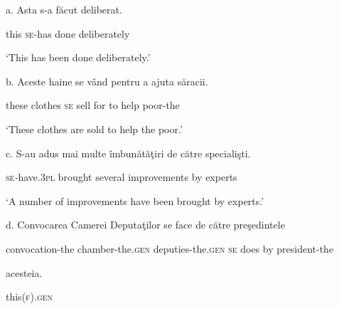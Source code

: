 \documentclass[output=paper]{langsci/langscibook}
\begin{document}
          a.   Asta s-a      făcut deliberat.

\begin{styleDSb}
      this  \textsc{se}{}-has done  deliberately
\end{styleDSb}

\begin{styleDSb}
     ‘This has been done deliberately.’
\end{styleDSb}

\begin{styleDSb}
b.   Aceste haine   se vând pentru a ajuta săracii.
\end{styleDSb}

\begin{styleDSb}
      these   clothes \textsc{se} sell   for      to help poor-the
\end{styleDSb}

\begin{styleDSb}
      ‘These clothes are sold to help the poor.’
\end{styleDSb}

\begin{styleDSb}
c.   S{}-au              adus     mai multe îmbunătăţiri    de către specialişti.
\end{styleDSb}

\begin{styleDSb}
    \textsc{se}\textit{{}-}have.\textsc{3pl} brought several      improvements by         experts
\end{styleDSb}

\begin{styleDSb}
     ‘A number of improvements have been brought by experts.’
\end{styleDSb}

\begin{styleDSb}
d.   Convocarea      Camerei                Deputaţilor           se  face de către preşedintele 
\end{styleDSb}

\begin{styleDSb}
      convocation-the chamber-the.\textsc{gen} deputies-the.\textsc{gen}  \textsc{se} does by    president-the
\end{styleDSb}

\begin{styleDSb}
     acesteia.
\end{styleDSb}

\begin{styleDSb}
      this(\textsc{f).gen}
\end{styleDSb}
\end{document}
